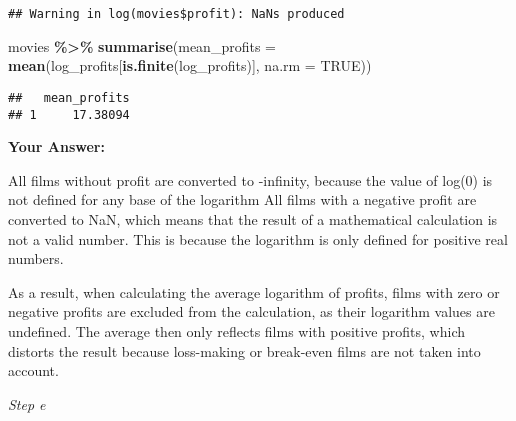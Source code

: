 \documentclass[
]{article}
\newenvironment{Shaded}{\begin{snugshade}}{\end{snugshade}}
\newcommand{\AttributeTok}[1]{\textcolor[rgb]{0.13,0.29,0.53}{#1}}
\newcommand{\CommentTok}[1]{\textcolor[rgb]{0.56,0.35,0.01}{\textit{#1}}}
\newcommand{\ConstantTok}[1]{\textcolor[rgb]{0.56,0.35,0.01}{#1}}
\newcommand{\DecValTok}[1]{\textcolor[rgb]{0.00,0.00,0.81}{#1}}
\newcommand{\FunctionTok}[1]{\textcolor[rgb]{0.13,0.29,0.53}{\textbf{#1}}}
\newcommand{\NormalTok}[1]{#1}
\newcommand{\OtherTok}[1]{\textcolor[rgb]{0.56,0.35,0.01}{#1}}
\newcommand{\SpecialCharTok}[1]{\textcolor[rgb]{0.81,0.36,0.00}{\textbf{#1}}}
\begin{document}
\begin{Shaded}
\end{Shaded}

\begin{verbatim}
## Warning in log(movies$profit): NaNs produced
\end{verbatim}

\begin{Shaded}
\begin{Highlighting}[]
\NormalTok{movies }\SpecialCharTok{\%\textgreater{}\%}
  \FunctionTok{summarise}\NormalTok{(}\AttributeTok{mean\_profits =} \FunctionTok{mean}\NormalTok{(log\_profits[}\FunctionTok{is.finite}\NormalTok{(log\_profits)], }\AttributeTok{na.rm =} \ConstantTok{TRUE}\NormalTok{))}
\end{Highlighting}
\end{Shaded}

\begin{verbatim}
##   mean_profits
## 1     17.38094
\end{verbatim}

\textbf{Your Answer:}

All films without profit are converted to -infinity, because the value
of log(0) is not defined for any base of the logarithm All films with a
negative profit are converted to NaN, which means that the result of a
mathematical calculation is not a valid number. This is because the
logarithm is only defined for positive real numbers.

As a result, when calculating the average logarithm of profits, films
with zero or negative profits are excluded from the calculation, as
their logarithm values are undefined. The average then only reflects
films with positive profits, which distorts the result because
loss-making or break-even films are not taken into account.

\emph{Step e}

\begin{Shaded}
\end{Shaded}
\end{document}
